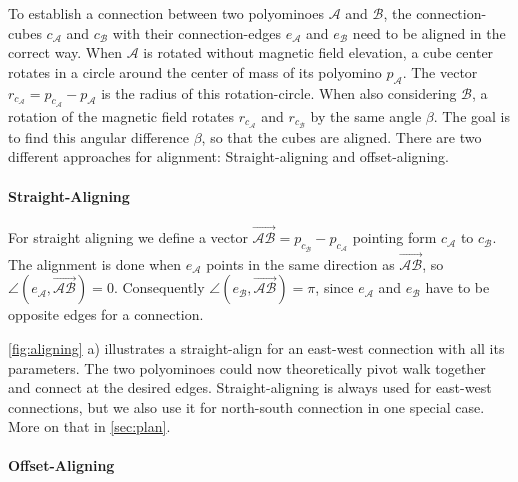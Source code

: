 To establish a connection between two polyominoes $\mathcal{A}$ and $\mathcal{B}$, the connection-cubes $c_\mathcal{A}$ and $c_\mathcal{B}$ with their connection-edges $e_\mathcal{A}$ and $e_\mathcal{B}$ need to be aligned in the correct way.
When $\mathcal{A}$ is rotated without magnetic field elevation, a cube center rotates in a circle around the center of mass of its polyomino $p_\mathcal{A}$.
The vector $r_{c_\mathcal{A}} = p_{c_\mathcal{A}} - p_\mathcal{A}$ is the radius of this rotation-circle.
When also considering $\mathcal{B}$, a rotation of the magnetic field rotates $r_{c_\mathcal{A}}$ and $r_{c_\mathcal{B}}$ by the same angle $\beta$.
The goal is to find this angular difference $\beta$, so that the cubes are aligned.
There are two different approaches for alignment: Straight-aligning and offset-aligning.

\paragraph{Straight-Aligning}

For straight aligning we define a vector $\overrightarrow{\mathcal{A}\mathcal{B}} = p_{c_\mathcal{B}} - p_{c_\mathcal{A}}$ pointing form $c_\mathcal{A}$ to $c_\mathcal{B}$.
The alignment is done when $e_\mathcal{A}$ points in the same direction as $\overrightarrow{\mathcal{A}\mathcal{B}}$, so $\angle \left( e_\mathcal{A}, \overrightarrow{\mathcal{A}\mathcal{B}} \right) = 0$.
Consequently $\angle \left( e_\mathcal{B}, \overrightarrow{\mathcal{A}\mathcal{B}} \right) = \pi$, since $e_\mathcal{A}$ and $e_\mathcal{B}$ have to be opposite edges for a connection.

\autoref{fig:aligning} a) illustrates a straight-align for an east-west connection with all its parameters.
The two polyominoes could now theoretically pivot walk together and connect at the desired edges.
Straight-aligning is always used for east-west connections, but we also use it for north-south connection in one special case. More on that in \autoref{sec:plan}.

\paragraph{Offset-Aligning}

